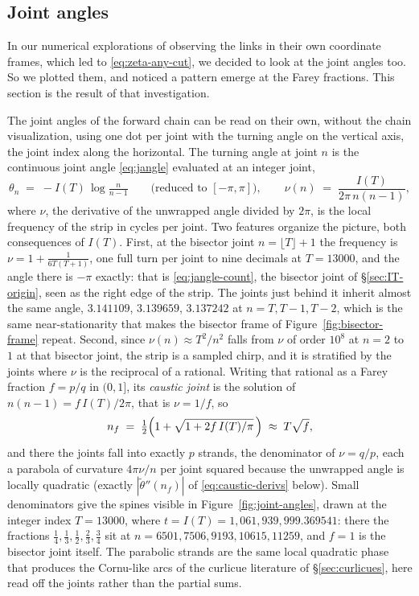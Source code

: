 \documentclass[11pt]{article}
\theoremstyle{definition}
\begin{document}
\subsection{Joint angles}\label{sec:joint-angles}

In our numerical explorations of observing the links in their own coordinate
frames, which led to \eqref{eq:zeta-any-cut}, we decided to look at the joint
angles too. So we plotted them, and noticed a pattern emerge at the Farey
fractions. This section is the result of that investigation.

The joint angles of the forward chain can be read on their own, without the
chain visualization, using one dot per joint with
the turning angle on the vertical axis, the joint index along the horizontal.
The turning angle at joint $n$ is the continuous joint angle \eqref{eq:jangle}
evaluated at an integer joint,
\begin{equation}\label{eq:theta-joint}
\theta_n \;=\; -I(T)\,\log\tfrac{n}{n-1}
\qquad\text{(reduced to $[-\pi,\pi]$)},
\qquad
\nu(n) \;=\; \frac{I(T)}{2\pi\,n(n-1)},
\end{equation}
where $\nu$, the derivative of
the unwrapped angle divided by $2\pi$, is the local frequency of the strip in
cycles per joint. Two features organize the picture, both consequences of
$I(T)$. First, at the bisector joint $n=\lfloor T\rfloor+1$ the frequency is
$\nu=1+\frac{1}{6T(T+1)}$, one full turn per joint to nine decimals at
$T=13000$, and the angle there is $-\pi$ exactly: that is
\eqref{eq:jangle-count}, the bisector joint of \S\ref{sec:IT-origin}, seen as the right
edge of the strip. The joints just behind it inherit almost the same angle,
$3.141109$, $3.139659$, $3.137242$ at $n=T,T-1,T-2$, which is the same
near-stationarity that makes the bisector frame of
Figure~\ref{fig:bisector-frame} repeat. Second, since
$\nu(n)\approx T^{2}/n^{2}$ falls from $\nu$ of order $10^{8}$ at $n=2$ to $1$ at that
bisector joint, the strip is a sampled chirp, and it is stratified by the joints where
$\nu$ is the reciprocal of a rational. Writing that rational as a Farey
fraction $f=p/q$ in $(0,1]$, its \emph{caustic joint} is the solution of
$n(n-1)=f\,I(T)/2\pi$, that is $\nu=1/f$, so
\begin{equation}\label{eq:caustic-joint}
n_{f}\;=\;\tfrac12\Bigl(1+\sqrt{1+2f\,I(T)/\pi}\,\Bigr)\;\approx\;T\sqrt{f},
\end{equation}
and there the joints fall into exactly $p$ strands, the denominator of
$\nu=q/p$, each a parabola of curvature $4\pi\nu/n$ per joint squared because
the unwrapped angle is locally quadratic (exactly
$|\widetilde\theta''(n_f)|$ of \eqref{eq:caustic-derivs} below). Small denominators give the spines
visible in Figure~\ref{fig:joint-angles}, drawn at the integer index $T=13000$,
where $t=I(T)=1{,}061{,}939{,}999.369541$: there the fractions
$\tfrac14,\tfrac13,\tfrac12,\tfrac23,\tfrac34$ sit at
$n=6501,7506,9193,10615,11259$, and $f=1$ is the bisector joint itself. The parabolic
strands are the same local quadratic phase that produces the Cornu-like arcs of
the curlicue literature of \S\ref{sec:curlicues}, here read off the joints
rather than the partial sums.
\end{document}
